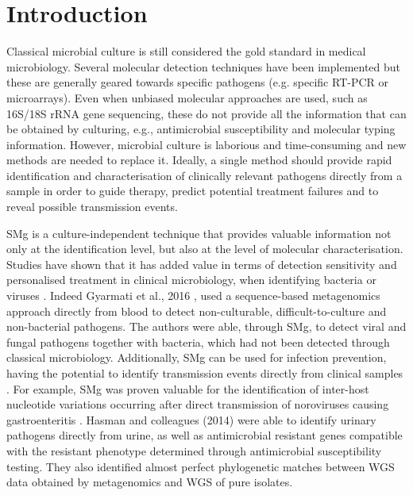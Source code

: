 \section{Introduction} \label{sec:ch2_introduction}

Classical microbial culture is still considered the gold standard in medical microbiology. 
Several molecular detection techniques have been implemented but these are generally geared towards specific pathogens (e.g. specific RT-PCR or microarrays). 
Even when unbiased molecular approaches are used, such as 16S/18S rRNA gene sequencing, these do not provide all the information that can be obtained by culturing, e.g., antimicrobial susceptibility and molecular typing information. 
However, microbial culture is laborious and time-consuming and new methods are needed to replace it. 
Ideally, a single method should provide rapid identification and characterisation of clinically relevant pathogens directly from a sample in order to guide therapy, predict potential treatment failures and to reveal possible transmission events.

\ac{SMg} is a culture-independent technique that provides valuable information not only at the identification level, but also at the level of molecular characterisation. 
Studies have shown that it has added value in terms of detection sensitivity and personalised treatment in clinical microbiology, when identifying bacteria \citep{hasman_rapid_2014, willmann_antibiotic_2015} or viruses \citep{graf_unbiased_2016}. 
Indeed Gyarmati et al., 2016 \citep{gyarmati_metagenomic_2016}, used a sequence-based metagenomics approach directly from blood to detect non-culturable, difficult-to-culture and non-bacterial pathogens. 
The authors were able, through \ac{SMg}, to detect viral and fungal pathogens together with bacteria, which had not been detected through classical microbiology. 
Additionally, \ac{SMg} can be used for infection prevention, having the potential to identify transmission events directly from clinical samples \citep{olson_metagenomic_2017}. 
For example, \ac{SMg} was proven valuable for the identification of inter-host nucleotide variations occurring after direct transmission of noroviruses causing gastroenteritis \citep{olson_metagenomic_2017}. 
Hasman and colleagues (2014) \citep{hasman_rapid_2014} were able to identify urinary pathogens directly from urine, as well as antimicrobial resistant genes compatible with the resistant phenotype determined through antimicrobial susceptibility testing. They also identified almost perfect phylogenetic matches between \ac{WGS} data obtained by metagenomics and \ac{WGS} of pure isolates. 

